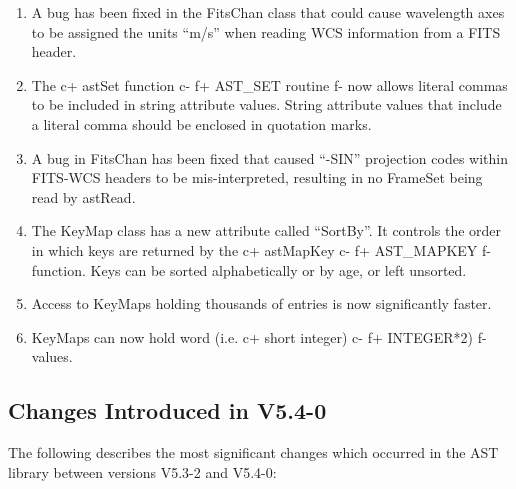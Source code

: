 \documentclass[twoside,11pt]{article}
\begin{document}
\begin{enumerate}

\item A bug has been fixed in the FitsChan class that could cause wavelength
axes to be assigned the units ``m/s'' when reading WCS information from a
FITS header.

\item The
c+
astSet function
c-
f+
AST\_SET routine
f-
now allows literal commas to be included in string attribute values. String
attribute values that include a literal comma should be enclosed in quotation
marks.

\item A bug in FitsChan has been fixed that caused ``-SIN'' projection
codes within FITS-WCS headers to be mis-interpreted, resulting in no
FrameSet being read by astRead.

\item The KeyMap class has a new attribute called ``SortBy''. It controls
the order in which keys are returned by the
c+
astMapKey
c-
f+
AST\_MAPKEY
f-
function. Keys can be sorted alphabetically or by age, or left unsorted.

\item Access to KeyMaps holding thousands of entries is now significantly
faster.

\item KeyMaps can now hold word (i.e.
c+
short integer)
c-
f+
INTEGER*2)
f-
values.

\end{enumerate}


\subsection{Changes Introduced in V5.4-0}

The following describes the most significant changes which
occurred in the AST library between versions V5.3-2 and V5.4-0:
\end{document}
